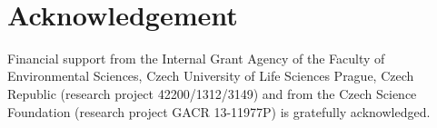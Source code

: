 \documentclass[review,times,3p,10pt]{elsarticle}
\begin{document}



\bigskip
~
\bigskip

\section{Acknowledgement}

Financial support from the Internal Grant Agency of the Faculty of Environmental Sciences, Czech University of Life Sciences Prague, Czech Republic (research project 42200/1312/3149) and from the Czech Science Foundation (research project GACR 13-11977P) is gratefully acknowledged.



\end{document}
